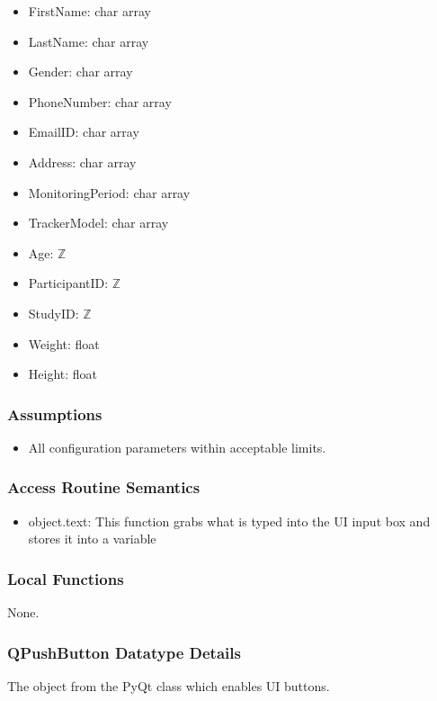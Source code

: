 \documentclass[12pt, titlepage]{article}
\begin{document}
\begin{itemize}
\item FirstName: char array
\item LastName: char array
\item Gender: char array
\item PhoneNumber: char array
\item EmailID: char array
\item Address: char array
\item MonitoringPeriod: char array
\item TrackerModel: char array
\item Age: $\mathbb{Z}$
\item ParticipantID: $\mathbb{Z}$
\item StudyID: $\mathbb{Z}$
\item Weight: float
\item Height: float
\end{itemize}


\subsubsection{Assumptions}

\begin{itemize}
\item All configuration parameters within acceptable limits.
\end{itemize}

\subsubsection{Access Routine Semantics}

\begin{itemize}
\item object.text: This function grabs what is typed into the UI input box and stores it into a variable
\end{itemize}

\subsubsection{Local Functions}

None.

\subsubsection{QPushButton Datatype Details}
The object from the PyQt class which enables UI buttons.
\end{document}
